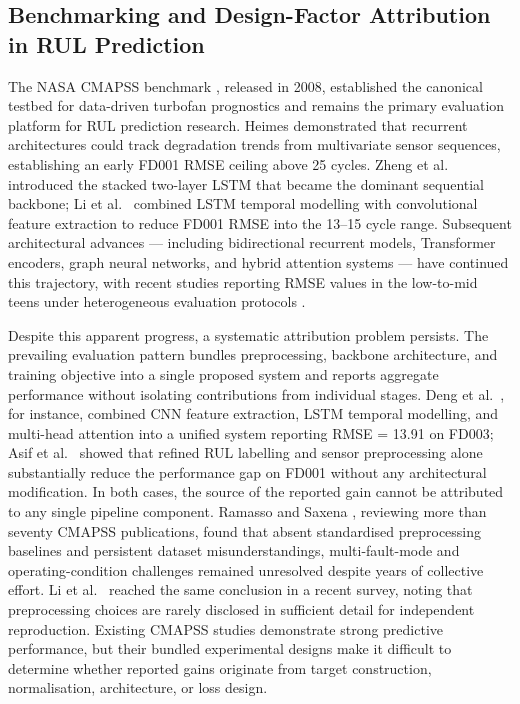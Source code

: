 \documentclass[review,12pt]{elsarticle}
\begin{document}
\subsection{Benchmarking and Design-Factor Attribution in RUL Prediction}

The NASA CMAPSS benchmark \cite{ref01}, released in 2008, established the canonical testbed for data-driven turbofan prognostics and remains the primary evaluation platform for RUL prediction research. Heimes \cite{ref02} demonstrated that recurrent architectures could track degradation trends from multivariate sensor sequences, establishing an early FD001 RMSE ceiling above 25 cycles. Zheng et al.\ \cite{ref05} introduced the stacked two-layer LSTM that became the dominant sequential backbone; Li et al.\ \cite{ref06} combined LSTM temporal modelling with convolutional feature extraction to reduce FD001 RMSE into the 13--15 cycle range. Subsequent architectural advances --- including bidirectional recurrent models, Transformer encoders, graph neural networks, and hybrid attention systems --- have continued this trajectory, with recent studies reporting RMSE values in the low-to-mid teens under heterogeneous evaluation protocols \cite{ref13,ref15,ref29}.

Despite this apparent progress, a systematic attribution problem persists. The prevailing evaluation pattern bundles preprocessing, backbone architecture, and training objective into a single proposed system and reports aggregate performance without isolating contributions from individual stages. Deng et al.\ \cite{ref29}, for instance, combined CNN feature extraction, LSTM temporal modelling, and multi-head attention into a unified system reporting RMSE = 13.91 on FD003; Asif et al.\ \cite{ref42} showed that refined RUL labelling and sensor preprocessing alone substantially reduce the performance gap on FD001 without any architectural modification. In both cases, the source of the reported gain cannot be attributed to any single pipeline component. Ramasso and Saxena \cite{ref03}, reviewing more than seventy CMAPSS publications, found that absent standardised preprocessing baselines and persistent dataset misunderstandings, multi-fault-mode and operating-condition challenges remained unresolved despite years of collective effort. Li et al.\ \cite{ref17} reached the same conclusion in a recent survey, noting that preprocessing choices are rarely disclosed in sufficient detail for independent reproduction. Existing CMAPSS studies demonstrate strong predictive performance, but their bundled experimental designs make it difficult to determine whether reported gains originate from target construction, normalisation, architecture, or loss design.
\end{document}
